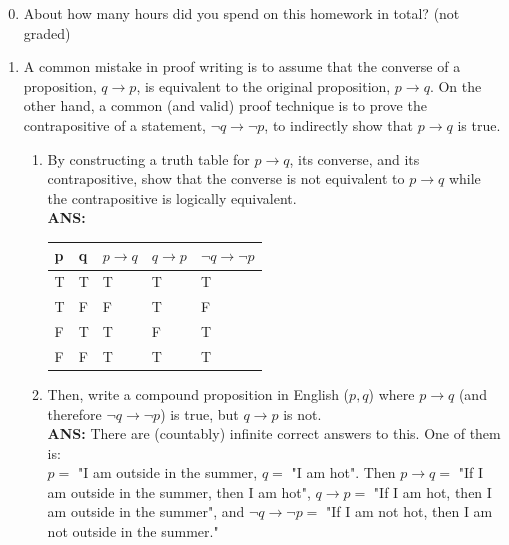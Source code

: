 \documentclass{article}
\begin{document}
\begin{enumerate}
    \setcounter{enumi}{-1}
    \item About how many hours did you spend on this homework in total? (not graded)
    \item A common mistake in proof writing is to assume that the converse of a proposition, $q \rightarrow p$, is equivalent to the original proposition, $p \rightarrow q$. On the other hand, a common (and valid) proof technique is to prove the contrapositive of a statement, $\neg q \rightarrow \neg p$, to indirectly show that $p \rightarrow q$ is true.
    \begin{enumerate}
        \item By constructing a truth table for $p \rightarrow q$, its converse, and its contrapositive, show that the converse is not equivalent to $p \rightarrow q$ while the contrapositive is logically equivalent. \\
        \textbf{ANS:}  \\
        
\begin{tabular}{|l|l|l|l|l|}
\hline
p & q & $p \rightarrow q$ & $q  \rightarrow p$ & $\neg q \rightarrow \neg p$ \\ \hline
T & T & T                              & T                              & T                                                                      \\ \hline
T & F & F                              & T                              & F                                                                      \\ \hline
F & T & T                              & F                              & T                                                                      \\ \hline
F & F & T                              & T                              & T                                                                      \\ \hline
\end{tabular}


        \item Then, write a compound proposition in English ($p, q$) where $p \rightarrow q$ (and therefore $\neg q \rightarrow \neg p$) is true, but $q \rightarrow p$ is not. \\
        \textbf{ANS: } There are (countably) infinite correct answers to this. One of them is: \\
        $p = $ "I am outside in the summer, $q = $ "I am hot". Then $p \rightarrow q = $ "If I am outside in the summer, then I am hot", $q \rightarrow p = $ "If I am hot, then I am outside in the summer", and $\neg q \rightarrow \neg p = $ "If I am not hot, then I am not outside in the summer."
        

\end{enumerate}
\end{enumerate}
\end{document}
